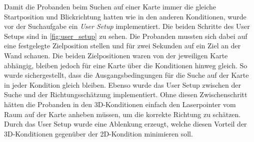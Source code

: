 Damit die Probanden beim Suchen auf einer Karte immer die gleiche Startposition und Blickrichtung hatten wie in den anderen Konditionen, wurde vor der Suchaufgabe ein \emph{User Setup} implementiert.
Die beiden Schritte des User Setups sind in \autoref{fig:user_setup} zu sehen.
Die Probanden mussten sich dabei auf eine festgelegte Zielposition stellen und für zwei Sekunden auf ein Ziel an der Wand schauen.
Die beiden Zielpositionen waren von der jeweiligen Karte abhängig, bleiben jedoch für eine Karte über die Konditionen hinweg gleich.
So wurde sichergestellt, dass die Ausgangsbedingungen für die Suche auf der Karte in jeder Kondition gleich bleiben.
Ebenso wurde das User Setup zwischen der Suche und der Richtungsschätzung implementiert.
Ohne diesen Zwischenschritt hätten die Probanden in den 3D-Konditionen einfach den Laserpointer vom Raum auf der Karte anheben müssen, um die korrekte Richtung zu schätzen.
Durch das User Setup wurde eine Ablenkung erzeugt, welche diesen Vorteil der 3D-Konditionen gegenüber der 2D-Kondition minimieren soll.
